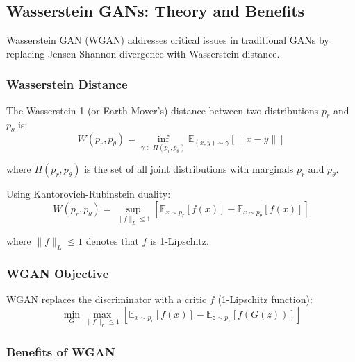 \documentclass[conference,12pt]{IEEEtran}
\begin{document}
\subsection{Wasserstein GANs: Theory and Benefits}

Wasserstein GAN (WGAN) addresses critical issues in traditional GANs by replacing Jensen-Shannon divergence with Wasserstein distance.

\subsubsection{Wasserstein Distance}

The Wasserstein-1 (or Earth Mover's) distance between two distributions $p_r$ and $p_\theta$ is:
\begin{equation}
    W(p_r, p_\theta) = \inf_{\gamma \in \Pi(p_r, p_\theta)} \mathbb{E}_{(x,y) \sim \gamma} [\|x-y\|]
\end{equation}

where $\Pi(p_r, p_\theta)$ is the set of all joint distributions with marginals $p_r$ and $p_\theta$.

Using Kantorovich-Rubinstein duality:
\begin{equation}
    W(p_r, p_\theta) = \sup_{\|f\|_L \leq 1} \left[ \mathbb{E}_{x \sim p_r}[f(x)] - \mathbb{E}_{x \sim p_\theta}[f(x)] \right]
\end{equation}

where $\|f\|_L \leq 1$ denotes that $f$ is 1-Lipschitz.

\subsubsection{WGAN Objective}

WGAN replaces the discriminator with a critic $f$ (1-Lipschitz function):
\begin{equation}
    \min_G \max_{\|f\|_L \leq 1} \left[ \mathbb{E}_{x \sim p_r}[f(x)] - \mathbb{E}_{z \sim p_z}[f(G(z))] \right]
\end{equation}

\subsubsection{Benefits of WGAN}
\end{document}
